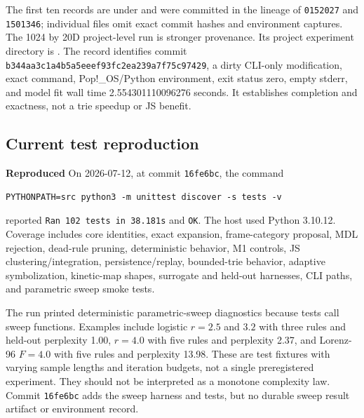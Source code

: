 \documentclass[11pt]{article}
\newcommand{\Reproduced}{\textbf{Reproduced}}
\begin{document}
The first ten records are under  and were committed in the lineage of \texttt{0152027} and \texttt{1501346}; individual files omit exact commit hashes and environment captures. The 1024 by 20D project-level run is stronger provenance. Its project experiment directory is . The record identifies commit \texttt{b344aa3c1a4b5a5eeef93fc2ea239a7f75c97429}, a dirty CLI-only modification, exact command, Pop!\_OS/Python environment, exit status zero, empty stderr, and model fit wall time 2.554301110096276 seconds. It establishes completion and exactness, not a trie speedup or JS benefit.

\subsection{Current test reproduction}
\Reproduced{} On 2026-07-12, at commit \texttt{16fe6bc}, the command
\begin{lstlisting}
PYTHONPATH=src python3 -m unittest discover -s tests -v
\end{lstlisting}
reported \texttt{Ran 102 tests in 38.181s} and \texttt{OK}. The host used Python 3.10.12. Coverage includes core identities, exact expansion, frame-category proposal, MDL rejection, dead-rule pruning, deterministic behavior, M1 controls, JS clustering/integration, persistence/replay, bounded-trie behavior, adaptive symbolization, kinetic-map shapes, surrogate and held-out harnesses, CLI paths, and parametric sweep smoke tests.

The run printed deterministic parametric-sweep diagnostics because tests call sweep functions. Examples include logistic $r=2.5$ and $3.2$ with three rules and held-out perplexity 1.00, $r=4.0$ with five rules and perplexity 2.37, and Lorenz-96 $F=4.0$ with five rules and perplexity 13.98. These are test fixtures with varying sample lengths and iteration budgets, not a single preregistered experiment. They should not be interpreted as a monotone complexity law. Commit \texttt{16fe6bc} adds the sweep harness and tests, but no durable sweep result artifact or environment record.
\end{document}
